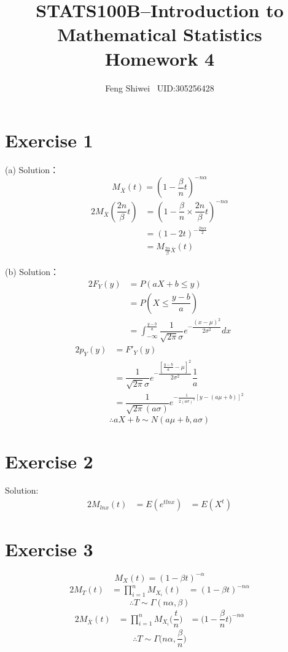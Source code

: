 \documentclass[a4papers]{ctexart}
\title{STATS100B--Introduction to Mathematical Statistics \\Homework 4}
\author{Feng Shiwei \ UID:305256428}
\date{}
\begin{document}
\maketitle
\section*{Exercise 1}
\noindent (a) Solution：\\
\indent 
\[M_{\overline{X}}\left( t\right) =\left( 1-\dfrac {\beta }{n}t\right) ^{-n\alpha }\]
\begin{alignat*}{2}
    M_{\overline {X}}\left( \dfrac {2n}{\beta }t\right) &=\left( 1-\dfrac {\beta }{n}\times \dfrac {2n}{\beta }t\right) ^{-n\alpha } \\
    &= \left(1-2t\right)^{-\frac{2n\alpha}{2}}\\
    &= M_{\frac{2n}{\beta}\overline{X}}(t)
\end{alignat*}


\noindent (b) Solution：\\
\begin{alignat*}{2}
    F_Y\left( y\right) &= P\left( aX+b\leq y\right) \\
    &= P(X\le\dfrac{y-b}{a}) \\
    &= \int _{-\infty}^{\frac {y-b}{ a}}\dfrac {1}{\sqrt {2\pi}\sigma }e^{-\dfrac {\left( x-\mu \right) ^{2}}{2\sigma ^{2}}}dx
\end{alignat*}
\begin{alignat*}{2}
p_{Y}\left( y\right) &= F'_{Y}\left( y\right)\\
    &=\dfrac {1}{\sqrt {2\pi }\sigma }e^{-\dfrac {\left[ \frac {y-b}{a}-\mu \right] ^{2}}{2\sigma ^{2}}}\dfrac {1}{a}\\
    &=\dfrac {1}{\sqrt {2\pi }\left( a\sigma \right) }e^{-\frac {1}{2\left( a\sigma \right)^2 }\left[ y-\left( a\mu +b\right) \right] ^{2}}
\end{alignat*}
\[
    \therefore aX+b \sim N(a\mu+b,a\sigma)    
\]

\section*{Exercise 2}
\noindent Solution:\\

\begin{alignat*}{2}
   M_{lnx}(t) &= E(e^{tlnx})
          &= E(X^t)
\end{alignat*}


\section*{Exercise 3}
\[ M_X(t)=(1-\beta t)^{-\alpha}\]
\begin{alignat*}{2}
    M_T(t) &= \prod_{i=1}^n M_{X_i}(t) 
           &= (1-\beta t)^{-n\alpha}
\end{alignat*}
\[\therefore T \sim \Gamma(n\alpha,\beta)\]
\begin{alignat*}{2}
    M_{\bar{X}}(t) &= \prod_{i=1}^n M_{X_i}\Big(\dfrac{t}{n}\Big)  
           &= \Big(1-\dfrac{\beta}{n} t\Big)^{-n\alpha}
\end{alignat*}
\[\therefore T \sim \Gamma\Big(n\alpha,\dfrac{\beta}{n}\Big)\]
\end{document}
